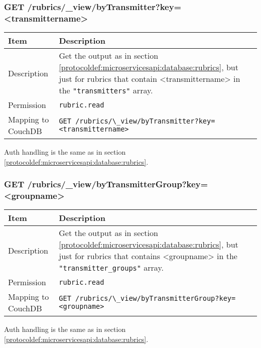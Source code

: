 \subsubsection{GET /rubrics/\_view/byTransmitter?key=<transmittername>}
\begin{table}[htbp]
  \begin{tabular}{|l|p{12cm}|} \hline
    Item               & Description  \\ \hline \hline
    Description        & Get the output as in section \ref{protocoldef:microservicesapi:database:rubrics}, but just for rubrics that contain <transmittername> in the \verb|"transmitters"| array. \\ \hline
    Permission         & \verb|rubric.read| \\ \hline
    Mapping to CouchDB & \verb|GET /rubrics/\_view/byTransmitter?key=<transmittername>| \\ \hline
  \end{tabular}
\end{table}
Auth handling is the same as in section \ref{protocoldef:microservicesapi:database:rubrics}.

\subsubsection{GET /rubrics/\_view/byTransmitterGroup?key=<groupname>}
\begin{table}[htbp]
  \begin{tabular}{|l|p{12cm}|} \hline
    Item               & Description  \\ \hline \hline
    Description        & Get the output as in section \ref{protocoldef:microservicesapi:database:rubrics}, but just for rubrics that contains <groupname> in the \verb|"transmitter_groups"| array. \\ \hline
    Permission         & \verb|rubric.read| \\ \hline
    Mapping to CouchDB & \verb|GET /rubrics/\_view/byTransmitterGroup?key=<groupname>| \\ \hline
  \end{tabular}
\end{table}
Auth handling is the same as in section \ref{protocoldef:microservicesapi:database:rubrics}.


